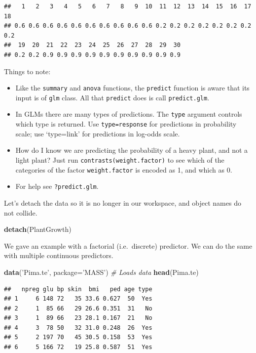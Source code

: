 \documentclass[]{book}
\newenvironment{Shaded}{\begin{snugshade}}{\end{snugshade}}
\newcommand{\CommentTok}[1]{\textcolor[rgb]{0.56,0.35,0.01}{\textit{#1}}}
\newcommand{\DataTypeTok}[1]{\textcolor[rgb]{0.13,0.29,0.53}{#1}}
\newcommand{\KeywordTok}[1]{\textcolor[rgb]{0.13,0.29,0.53}{\textbf{#1}}}
\newcommand{\NormalTok}[1]{#1}
\newcommand{\StringTok}[1]{\textcolor[rgb]{0.31,0.60,0.02}{#1}}
\providecommand{\tightlist}{%
  \setlength{\itemsep}{0pt}\setlength{\parskip}{0pt}}
\theoremstyle{definition}
\theoremstyle{definition}
\theoremstyle{definition}
\theoremstyle{remark}
\begin{document}
\begin{verbatim}
##   1   2   3   4   5   6   7   8   9  10  11  12  13  14  15  16  17  18 
## 0.6 0.6 0.6 0.6 0.6 0.6 0.6 0.6 0.6 0.6 0.2 0.2 0.2 0.2 0.2 0.2 0.2 0.2 
##  19  20  21  22  23  24  25  26  27  28  29  30 
## 0.2 0.2 0.9 0.9 0.9 0.9 0.9 0.9 0.9 0.9 0.9 0.9
\end{verbatim}

Things to note:

\begin{itemize}
\tightlist
\item
  Like the \texttt{summary} and \texttt{anova} functions, the \texttt{predict} function is aware that its input is of \texttt{glm} class. All that \texttt{predict} does is call \texttt{predict.glm}.
\item
  In GLMs there are many types of predictions. The \texttt{type} argument controls which type is returned. Use \texttt{type=response} for predictions in probability scale; use `type=link' for predictions in log-odds scale.
\item
  How do I know we are predicting the probability of a heavy plant, and not a light plant? Just run \texttt{contrasts(weight.factor)} to see which of the categories of the factor \texttt{weight.factor} is encoded as 1, and which as 0.
\item
  For help see \texttt{?predict.glm}.
\end{itemize}

Let's detach the data so it is no longer in our workspace, and object names do not collide.

\begin{Shaded}
\begin{Highlighting}[]
\KeywordTok{detach}\NormalTok{(PlantGrowth)}
\end{Highlighting}
\end{Shaded}

We gave an example with a factorial (i.e.~discrete) predictor.
We can do the same with multiple continuous predictors.

\begin{Shaded}
\begin{Highlighting}[]
\KeywordTok{data}\NormalTok{(}\StringTok{'Pima.te'}\NormalTok{, }\DataTypeTok{package=}\StringTok{'MASS'}\NormalTok{) }\CommentTok{# Loads data}
\KeywordTok{head}\NormalTok{(Pima.te)}
\end{Highlighting}
\end{Shaded}

\begin{verbatim}
##   npreg glu bp skin  bmi   ped age type
## 1     6 148 72   35 33.6 0.627  50  Yes
## 2     1  85 66   29 26.6 0.351  31   No
## 3     1  89 66   23 28.1 0.167  21   No
## 4     3  78 50   32 31.0 0.248  26  Yes
## 5     2 197 70   45 30.5 0.158  53  Yes
## 6     5 166 72   19 25.8 0.587  51  Yes
\end{verbatim}
\end{document}
